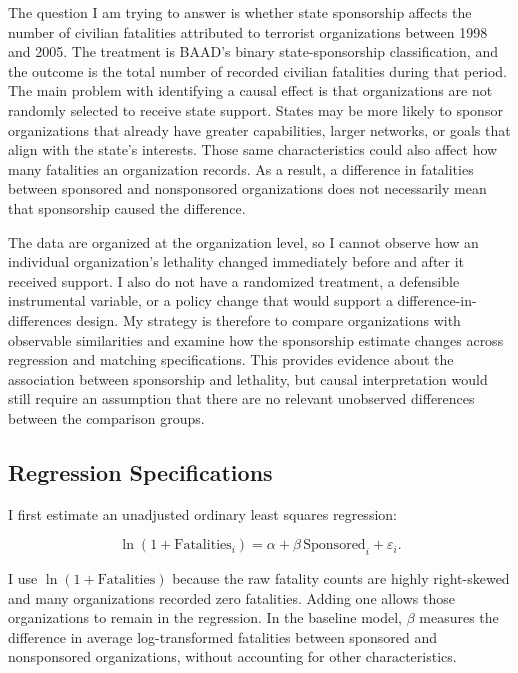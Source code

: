 \documentclass{article}
\begin{document}
The question I am trying to answer is whether state sponsorship affects the number of civilian fatalities attributed to terrorist organizations between 1998 and 2005. The treatment is BAAD's binary state-sponsorship classification, and the outcome is the total number of recorded civilian fatalities during that period. The main problem with identifying a causal effect is that organizations are not randomly selected to receive state support. States may be more likely to sponsor organizations that already have greater capabilities, larger networks, or goals that align with the state's interests. Those same characteristics could also affect how many fatalities an organization records. As a result, a difference in fatalities between sponsored and nonsponsored organizations does not necessarily mean that sponsorship caused the difference.

The data are organized at the organization level, so I cannot observe how an individual organization's lethality changed immediately before and after it received support. I also do not have a randomized treatment, a defensible instrumental variable, or a policy change that would support a difference-in-differences design. My strategy is therefore to compare organizations with observable similarities and examine how the sponsorship estimate changes across regression and matching specifications. This provides evidence about the association between sponsorship and lethality, but causal interpretation would still require an assumption that there are no relevant unobserved differences between the comparison groups.

\subsection{Regression Specifications}

I first estimate an unadjusted ordinary least squares regression:

\begin{equation}
\ln(1+\mathrm{Fatalities}_i)=\alpha+\beta\,\mathrm{Sponsored}_i+\varepsilon_i.
\end{equation}

I use $\ln(1+\mathrm{Fatalities})$ because the raw fatality counts are highly right-skewed and many organizations recorded zero fatalities. Adding one allows those organizations to remain in the regression. In the baseline model, $\beta$ measures the difference in average log-transformed fatalities between sponsored and nonsponsored organizations, without accounting for other characteristics.
\end{document}
